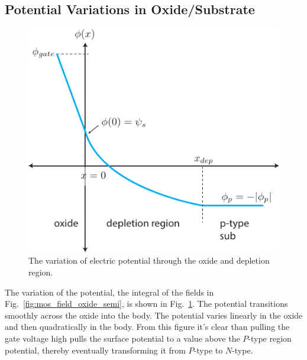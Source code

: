 \subsection{Potential Variations in Oxide/Substrate}
\begin{figure}[tbh]
\centering
\includegraphics[width=.5\columnwidth]{MOS_potential}
\caption{The variation of electric potential through the oxide and depletion region. } \label{fig:MOS_potential}
\end{figure}
The variation of the potential, the integral of the fields in Fig.~\ref{fig:mos_field_oxide_semi}, is shown in Fig.~\ref{fig:MOS_potential}.  The potential transitions smoothly across the oxide into the body.  The potential varies linearly in the oxide and then quadratically in the body.  From this figure it's clear than pulling the gate voltage high pulls the surface potential to a value above the $P$-type region potential, thereby eventually transforming it from $P$-type to $N$-type. 
